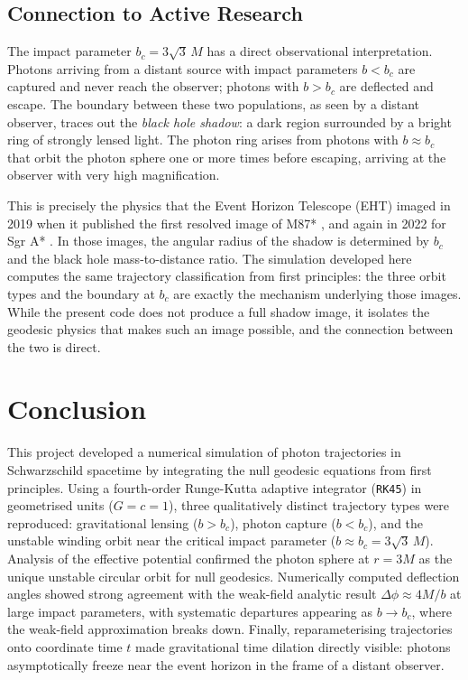 \documentclass[12pt,a4paper]{article}
\begin{document}
\subsection{Connection to Active Research}

The impact parameter $b_c = 3\sqrt{3}\,M$ has a direct observational
interpretation. Photons arriving from a distant source with impact parameters
$b < b_c$ are captured and never reach the observer; photons with $b > b_c$
are deflected and escape. The boundary between these two populations, as seen
by a distant observer, traces out the \emph{black hole shadow}: a dark region
surrounded by a bright ring of strongly lensed light. The photon ring arises
from photons with $b \approx b_c$ that orbit the photon sphere one or more times
before escaping, arriving at the observer with very high magnification.

This is precisely the physics that the Event Horizon Telescope (EHT) imaged in
2019 when it published the first resolved image of M87* \citep{EHT2019}, and
again in 2022 for Sgr A* \citep{EHT2022SgrA}. In those images, the angular radius
of the shadow is determined by $b_c$ and the black hole mass-to-distance ratio.
The simulation developed here computes the same trajectory classification from
first principles: the three orbit types and the boundary at $b_c$ are exactly
the mechanism underlying those images. While the present code does not produce
a full shadow image, it isolates the geodesic physics that makes such an image
possible, and the connection between the two is direct.

\section{Conclusion}

This project developed a numerical simulation of photon trajectories in Schwarzschild spacetime
by integrating the null geodesic equations from first principles. Using a fourth-order
Runge-Kutta adaptive integrator (\texttt{RK45}) in geometrised units ($G = c = 1$), three
qualitatively distinct trajectory types were reproduced: gravitational lensing ($b > b_c$),
photon capture ($b < b_c$), and the unstable winding orbit near the critical impact parameter
($b \approx b_c = 3\sqrt{3}\,M$). Analysis of the effective potential confirmed the photon
sphere at $r = 3M$ as the unique unstable circular orbit for null geodesics. Numerically
computed deflection angles showed strong agreement with the weak-field analytic result
$\Delta\phi \approx 4M/b$ at large impact parameters, with systematic departures appearing
as $b \to b_c$, where the weak-field approximation breaks down. Finally, reparameterising
trajectories onto coordinate time $t$ made gravitational time dilation directly visible:
photons asymptotically freeze near the event horizon in the frame of a distant observer.
\end{document}
